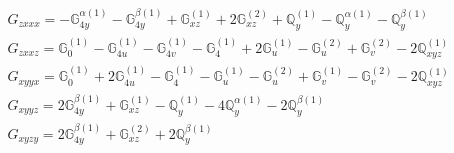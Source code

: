 \documentclass[fleqn,8pt,landscape]{jsarticle}
\begin{document}
\begin{align*}
& G_{zxxx} = - \mathbb{G}_{4y}^{\alpha(1)} - \mathbb{G}_{4y}^{\beta(1)} + \mathbb{G}_{xz}^{(1)} + 2 \mathbb{G}_{xz}^{(2)} + \mathbb{Q}_{y}^{(1)} - \mathbb{Q}_{y}^{\alpha(1)} - \mathbb{Q}_{y}^{\beta(1)} \\
& G_{zxxz} = \mathbb{G}_{0}^{(1)} - \mathbb{G}_{4u}^{(1)} - \mathbb{G}_{4v}^{(1)} - \mathbb{G}_{4}^{(1)} + 2 \mathbb{G}_{u}^{(1)} - \mathbb{G}_{u}^{(2)} + \mathbb{G}_{v}^{(2)} - 2 \mathbb{Q}_{xyz}^{(1)} \\
& G_{xyyx} = \mathbb{G}_{0}^{(1)} + 2 \mathbb{G}_{4u}^{(1)} - \mathbb{G}_{4}^{(1)} - \mathbb{G}_{u}^{(1)} - \mathbb{G}_{u}^{(2)} + \mathbb{G}_{v}^{(1)} - \mathbb{G}_{v}^{(2)} - 2 \mathbb{Q}_{xyz}^{(1)} \\
& G_{xyyz} = 2 \mathbb{G}_{4y}^{\beta(1)} + \mathbb{G}_{xz}^{(1)} - \mathbb{Q}_{y}^{(1)} - 4 \mathbb{Q}_{y}^{\alpha(1)} - 2 \mathbb{Q}_{y}^{\beta(1)} \\
& G_{xyzy} = 2 \mathbb{G}_{4y}^{\beta(1)} + \mathbb{G}_{xz}^{(2)} + 2 \mathbb{Q}_{y}^{\beta(1)}
\end{align*}
\end{document}
